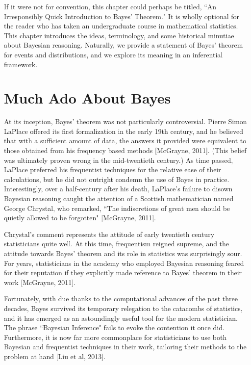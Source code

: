 \documentclass[12pt,twoside]{reedthesis}
\begin{document}
	If it were not for convention, this chapter could perhaps be titled, ``An Irresponsibly Quick Introduction to Bayes' Theorem." It is wholly optional for the reader who has taken an undergraduate course in mathematical statistics. This chapter introduces the ideas, terminology, and some historical minutiae about Bayesian reasoning. Naturally, we provide a statement of Bayes' theorem for events and distributions, and we explore its meaning in an inferential framework. 
	\section{Much Ado About Bayes}
	At its inception, Bayes' theorem was not particularly controversial. Pierre Simon LaPlace offered its first formalization in the early 19th century, and he believed that with a sufficient amount of data, the answers it provided were equivalent to those obtained from his frequency based methods [McGrayne, 2011]. (This belief was ultimately proven wrong in the mid-twentieth century.)
	As time passed, LaPlace preferred his frequentist techniques for the relative ease of their calculations, but he did not outright condemn the use of Bayes in practice. Interestingly, over a half-century after his death, LaPlace's failure to disown Bayesian reasoning caught the attention of a Scottish mathematician named George Chrystal, who remarked, ``The indiscretions of great men should be quietly allowed to be forgotten" [McGrayne, 2011].
	
	Chrystal's comment represents the attitude of early twentieth century statisticians quite well. At this time, frequentism reigned supreme, and the attitude towards Bayes' theorem and its role in statistics was surprisingly sour. For years, statisticians in the academy who employed Bayesian reasoning feared for their reputation if they explicitly made reference to Bayes' theorem in their work [McGrayne, 2011]. 
	
	Fortunately, with due thanks to the computational advances of the past three decades, Bayes survived its temporary relegation to the catacombs of statistics, and it has emerged as an astoundingly useful tool for the modern statistician. The phrase ``Bayesian Inference" fails to evoke the contention it once did. Furthermore, it is now far more commonplace for statisticians to use both Bayesian and frequentist techniques in their work, tailoring their methods to the problem at hand [Liu et al, 2013].
	
\end{document}
